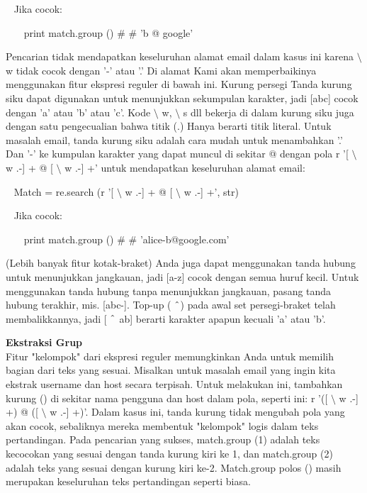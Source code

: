 \begin {enumerate}
\begin {enumerate}
~ Jika cocok:

~~~ print match.group ()  $  \#  $ $  \#  $ 'b @ google'

Pencarian tidak mendapatkan keseluruhan alamat email dalam kasus ini karena  $  \setminus  $ w tidak cocok dengan '-' atau '.' Di alamat Kami akan memperbaikinya menggunakan fitur ekspresi reguler di bawah ini. Kurung persegi Tanda kurung siku dapat digunakan untuk menunjukkan sekumpulan karakter, jadi [abc] cocok dengan 'a' atau 'b' atau 'c'. Kode  $  \setminus  $ w,  $  \setminus  $ s dll bekerja di dalam kurung siku juga dengan satu pengecualian bahwa titik (.) Hanya berarti titik literal. Untuk masalah email, tanda kurung siku adalah cara mudah untuk menambahkan '.' Dan '-' ke kumpulan karakter yang dapat muncul di sekitar @ dengan pola r '[ $  \setminus  $ w .-] + @ [ $  \setminus  $ w .-] +' untuk mendapatkan keseluruhan alamat email:

~ Match = re.search (r '[ $  \setminus  $ w .-] + @ [ $  \setminus  $ w .-] +', str)

~ Jika cocok:

~~~ print match.group ()  $  \#  $ $  \#  $ 'alice-b@google.com'

(Lebih banyak fitur kotak-braket) Anda juga dapat menggunakan tanda hubung untuk menunjukkan jangkauan, jadi [a-z] cocok dengan semua huruf kecil. Untuk menggunakan tanda hubung tanpa menunjukkan jangkauan, pasang tanda hubung terakhir, mis. [abc-]. Top-up ( $  \string^  $) pada awal set persegi-braket telah membalikkannya, jadi [ $  \string^  $ ab] berarti karakter apapun kecuali 'a' atau 'b'. \par
\vspace{16pt}
{\fontsize{14pt}{14pt}\selectfont \textbf{Ekstraksi Grup} \\}
Fitur "kelompok" dari ekspresi reguler memungkinkan Anda untuk memilih bagian dari teks yang sesuai. Misalkan untuk masalah email yang ingin kita ekstrak username dan host secara terpisah. Untuk melakukan ini, tambahkan kurung () di sekitar nama pengguna dan host dalam pola, seperti ini: r '([ $  \setminus  $ w .-] +) @ ([ $  \setminus  $ w .-] +)'. Dalam kasus ini, tanda kurung tidak mengubah pola yang akan cocok, sebaliknya mereka membentuk "kelompok" logis dalam teks pertandingan. Pada pencarian yang sukses, match.group (1) adalah teks kecocokan yang sesuai dengan tanda kurung kiri ke 1, dan match.group (2) adalah teks yang sesuai dengan kurung kiri ke-2. Match.group polos () masih merupakan keseluruhan teks pertandingan seperti biasa.


\end{enumerate}
\end{enumerate}
